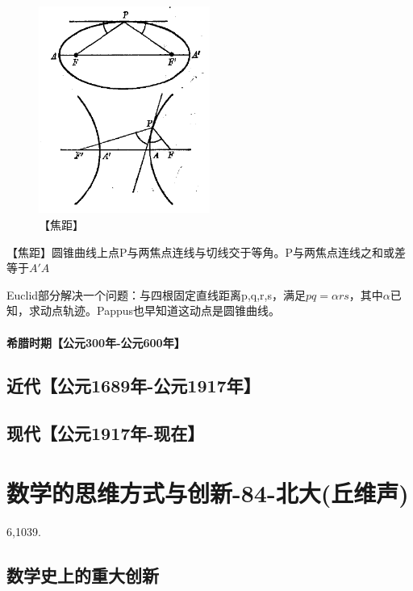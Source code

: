 \begin{figure}[h]
    \centering
    \includegraphics[width=0.5\textwidth]{./resources/古今数学思想-图4_29.png}
    \caption{【焦距】}\label{fig:7}
\end{figure}
【焦距】圆锥曲线上点P与两焦点连线与切线交于等角。P与两焦点连线之和或差等于$A'A$

Euclid部分解决一个问题：与四根固定直线距离p,q,r,s，满足$pq = \alpha rs$，其中$\alpha$已知，求动点轨迹。Pappus也早知道这动点是圆锥曲线。

\paragraph{希腊时期【公元300年-公元600年】}



\subsection{近代【公元1689年-公元1917年】}


\subsection{现代【公元1917年-现在】}




\section{数学的思维方式与创新-84-北大(丘维声)}
6,1039. 

\subsection{数学史上的重大创新}


